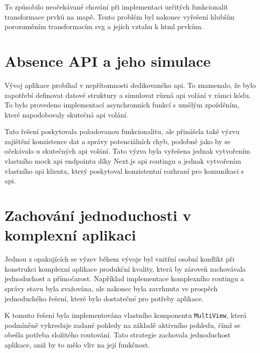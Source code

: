 To způsobilo neočekávané chování při implementaci určitých funkcionalit transformace prvků na mapě.
Tento problém byl nakonec vyřešení hlubším porozuměním transformacím \ac{svg} a jejich vztahu k \ac{html} prvkům.

\section{Absence API a jeho simulace}
\label{sec:vyzvy-a-problemy-absence-api}
Vývoj aplikace probíhal v nepřítomnosti dedikovaného \ac{api}.
To znamenalo, že bylo zapotřebí definovat datové struktury a simulovat různá \ac{api} volání v rámci kódu.
To bylo provedeno implementací asynchronních funkcí s umělým zpožděním, které napodobovaly skutečná \ac{api} volání.

Tato řešení poskytovala požadovanou funkcionalitu, ale přinášela také výzvu zajištění konzistence dat a správy potenciálních chyb, podobně jako by se očekávalo u skutečných \ac{api} volání.
Tato výzva byla vyřešena jednak vytvořením vlastního mock \ac{api} endpointu díky Next.js \ac{api} routingu\cite{n_basics_api_routes} a jednak vytvořením vlastního \ac{api} klienta, který poskytoval konzistentní rozhraní pro komunikaci s \ac{api}.

\section{Zachování jednoduchosti v komplexní aplikaci}
\label{sec:vyzvy-a-problemy-zachovani-jednoduchosti}
Jednou z opakujících se výzev během vývoje byl vnitřní osobní konflikt při konstrukci komplexní aplikace produkční kvality, která by zároveň zachovávala jednoduchost a přímočarost.
Například implementace komplexního routingu a správy stavu byla zvažována, ale nakonec byla zavrhnuta ve prospěch jednoduchého řešení, které bylo dostatečné pro potřeby aplikace.

K tomuto řešení byla implementována vlastního komponentu \texttt{MultiView}, která podmíněně vykresluje zadané pohledy na základě aktivního pohledu, čímž se obešla potřeba složitého routování.
Tato strategie zachovala jednoduchost aplikace, aniž by to mělo vliv na její funkčnost.

